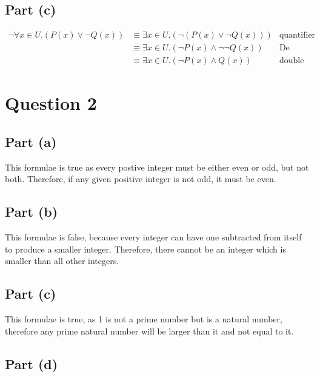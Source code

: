 \documentclass[11pt, a4paper]{article}
\begin{document}
\subsection*{Part (c)}
\begin{align*}
	\neg \forall x \in U.(P(x) \lor \neg Q(x)) &\equiv \exists x \in U.(\neg (P(x) \lor \neg Q(x)))     & \text{quantifier law} \\
	                                           &\equiv \exists x \in U.(\neg P(x) \land \neg \neg Q(x)) & \text{De Morgan's law} \\
						   &\equiv \exists x \in U.(\neg P(x) \land Q(x))           & \text{double negation law}
\end{align*}

\section*{Question 2}
\subsection*{Part (a)}
This formulae is true as every postive integer must be either even or odd, but not both.
Therefore, if any given positive integer is not odd, it must be even.

\subsection*{Part (b)}
This formulae is false, because every integer can have one subtracted from itself to produce a smaller integer.
Therefore, there cannot be an integer which is smaller than all other integers.

\subsection*{Part (c)}
This formulae is true, as 1 is not a prime number but is a natural number, therefore any prime natural number will be larger than it and not equal to it.

\subsection*{Part (d)}
\end{document}
